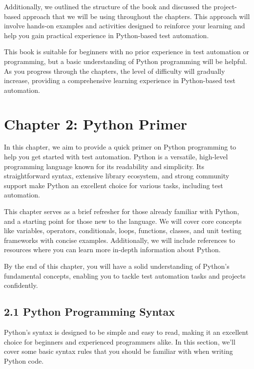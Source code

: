 \documentclass[
  paper=a4,
  ,captions=tableheading
]{scrartcl}
\begin{document}
Additionally, we outlined the structure of the book and discussed the
project-based approach that we will be using throughout the chapters.
This approach will involve hands-on examples and activities designed to
reinforce your learning and help you gain practical experience in
Python-based test automation.

This book is suitable for beginners with no prior experience in test
automation or programming, but a basic understanding of Python
programming will be helpful. As you progress through the chapters, the
level of difficulty will gradually increase, providing a comprehensive
learning experience in Python-based test automation.

\hypertarget{chapter-2-python-primer}{%
\chapter{Chapter 2: Python Primer}\label{chapter-2-python-primer}}

In this chapter, we aim to provide a quick primer on Python programming
to help you get started with test automation. Python is a versatile,
high-level programming language known for its readability and
simplicity. Its straightforward syntax, extensive library ecosystem, and
strong community support make Python an excellent choice for various
tasks, including test automation.

This chapter serves as a brief refresher for those already familiar with
Python, and a starting point for those new to the language. We will
cover core concepts like variables, operators, conditionals, loops,
functions, classes, and unit testing frameworks with concise examples.
Additionally, we will include references to resources where you can
learn more in-depth information about Python.

By the end of this chapter, you will have a solid understanding of
Python's fundamental concepts, enabling you to tackle test automation
tasks and projects confidently.

\hypertarget{python-programming-syntax}{%
\section{2.1 Python Programming
Syntax}\label{python-programming-syntax}}

Python's syntax is designed to be simple and easy to read, making it an
excellent choice for beginners and experienced programmers alike. In
this section, we'll cover some basic syntax rules that you should be
familiar with when writing Python code.
\end{document}
